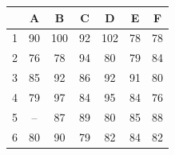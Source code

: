 \documentclass[10pt, a4paper]{article}
\begin{document}
\begin{enumerate}
{\begin{center}
	\begin{tabular}{| p{1cm} ||c|c|c|c|c|c|}
		\hline
		\empty & A & B & C & D & E & F \\
		\hline
		1 & 90 & 100 & 92 & 102 & 78 & 78 \\
		2 & 76 & 78 & 94 & 80 & 79 & 84 \\
		3 & 85 & 92 & 86 & 92 & 91 & 80 \\
		4 & 79 & 97 & 84 & 95 & 84 & 76 \\
		5 & -- & 87 & 89 & 80 & 85 & 88 \\
		6 & 80 & 90 & 79 & 82 & 84 & 82 \\
		\hline
	\end{tabular}
\end{center}
}
\end{enumerate}
\end{document}
